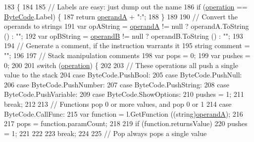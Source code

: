 \begin{DoxyCode}
183                                                       \{
184 
185             \textcolor{comment}{// Labels are easy: just dump out the name}
186             \textcolor{keywordflow}{if} (\hyperlink{a00093_a566bf5f7198cc353ea5c3710cb3a31cb}{operation} == \hyperlink{a00029_ad5dfb6ee68ca7469623ad3e459f98894}{ByteCode}.Label) \{
187                 \textcolor{keywordflow}{return} \hyperlink{a00093_ab5d386faa0d3dbc23db80f8e62706afd}{operandA} + \textcolor{stringliteral}{":"};
188             \}
189 
190             \textcolor{comment}{// Convert the operands to strings}
191             var opAString = \hyperlink{a00093_ab5d386faa0d3dbc23db80f8e62706afd}{operandA} != null ? operandA.ToString () : \textcolor{stringliteral}{""};
192             var opBString = \hyperlink{a00093_a56348c6fe7eb919b7277afc06e5b224a}{operandB} != null ? operandB.ToString () : \textcolor{stringliteral}{""};
193 
194             \textcolor{comment}{// Generate a comment, if the instruction warrants it}
195             \textcolor{keywordtype}{string} comment = \textcolor{stringliteral}{""};
196 
197             \textcolor{comment}{// Stack manipulation comments}
198             var pops = 0;
199             var pushes = 0;
200 
201             \textcolor{keywordflow}{switch} (\hyperlink{a00093_a566bf5f7198cc353ea5c3710cb3a31cb}{operation}) \{
202 
203             \textcolor{comment}{// These operations all push a single value to the stack}
204             \textcolor{keywordflow}{case} ByteCode.PushBool:
205             \textcolor{keywordflow}{case} ByteCode.PushNull:
206             \textcolor{keywordflow}{case} ByteCode.PushNumber:
207             \textcolor{keywordflow}{case} ByteCode.PushString:
208             \textcolor{keywordflow}{case} ByteCode.PushVariable:
209             \textcolor{keywordflow}{case} ByteCode.ShowOptions:
210                 pushes = 1;
211                 \textcolor{keywordflow}{break};
212 
213             \textcolor{comment}{// Functions pop 0 or more values, and pop 0 or 1 }
214             \textcolor{keywordflow}{case} ByteCode.CallFunc:
215                 var \textcolor{keyword}{function} = l.GetFunction ((string)\hyperlink{a00093_ab5d386faa0d3dbc23db80f8e62706afd}{operandA});
216 
217                 pops = function.paramCount;
218 
219                 \textcolor{keywordflow}{if} (\textcolor{keyword}{function}.returnsValue)
220                     pushes = 1;
221                 
222 
223                 \textcolor{keywordflow}{break};
224             
225             \textcolor{comment}{// Pop always pops a single value}

\end{DoxyCode}
